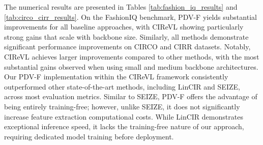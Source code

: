 The numerical results are presented in Tables \ref{tab:fashion_iq_results} and \ref{tab:circo_cirr_results}.
On the FashionIQ benchmark, PDV-F yields substantial improvements for all baseline approaches, with CIReVL showing particularly strong gains that scale with backbone size. Similarly, all methods demonstrate significant performance improvements on CIRCO and CIRR datasets. Notably, CIReVL achieves larger improvements compared to other methods, with the most substantial gains observed when using small and medium backbone architectures. Our PDV-F implementation within the CIReVL framework consistently outperformed other state-of-the-art methods, including LinCIR and SEIZE, across most evaluation metrics. Similar to SEIZE, PDV-F offers the advantage of being entirely training-free; however, unlike SEIZE, it does not significantly increase feature extraction computational costs. While LinCIR demonstrates exceptional inference speed, it lacks the training-free nature of our approach, requiring dedicated model training before deployment.  




